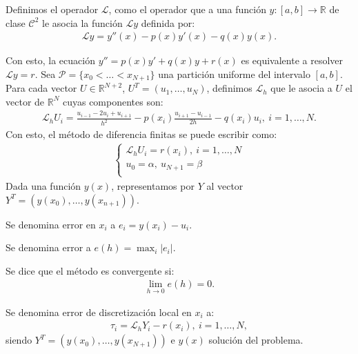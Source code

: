 \begin{defi}
    Definimos el operador $\mathcal{L}$, como el operador que a una función $y: [a,b] \longrightarrow \mathbb{R}$ de clase $\mathcal{C}^2$ le asocia la función $\mathcal{L}y$ definida por:
    \begin{align*}
        \mathcal{L}y = y''(x) - p(x)y'(x) - q(x)y(x).
    \end{align*}
\end{defi}
Con esto, la ecuación $y'' =  p(x)y' + q(x)y + r(x)$ es equivalente a resolver $\mathcal{L}y = r$. Sea $\mathcal{P} = \{ x_0 < \ldots < x_{N+1}\}$ una partición uniforme del intervalo $[a,b]$. Para cada vector $U \in \mathbb{R}^{N+2}$, $U^T = (u_1,\ldots,u_N)$, definimos $\mathcal{L}_h$ que le asocia a $U$ el vector de $\mathbb{R}^N$ cuyas componentes son:
\begin{align*}
    \mathcal{L}_hU_i = \frac{u_{i-1} - 2u_i + u_{i+1}}{h^2} -p(x_i)\frac{u_{i+1} - u_{i-1}}{2h} - q(x_i)u_i, \ i = 1,\ldots,N.
\end{align*}
Con esto, el método de diferencia finitas se puede escribir como:
\begin{align*}
    \left\{ \begin{array}{lcc}
                \mathcal{L}_hU_i = r(x_i), \ i = 1,\ldots,N \\
                u_0 = \alpha, \ u_{N+1} = \beta             \\
            \end{array}
    \right.
\end{align*}
Dada una función $y(x)$, representamos por $Y$ al vector $Y^T = (y(x_0), \ldots, y(x_{n+1}))$.

\begin{defi}
    Se denomina error en $x_i$ a $e_i = y(x_i) - u_i$.
\end{defi}

\begin{defi}
    Se denomina error a $e(h) = \max_{i} |e_i|$.
\end{defi}

\begin{defi}
    Se dice que el método es convergente si:
    \begin{align*}
        \lim_{h \to 0} e(h) = 0.
    \end{align*}
\end{defi}

\begin{defi}
    Se denomina error de discretización local en $x_i$ a:
    \begin{align*}
        \tau_i = \mathcal{L}_hY_i - r(x_i), \ i = 1,\ldots,N,
    \end{align*}
    siendo $Y^T = (y(x_0), \ldots, y(x_{N+1}))$ e $y(x)$ solución del problema.
\end{defi}

